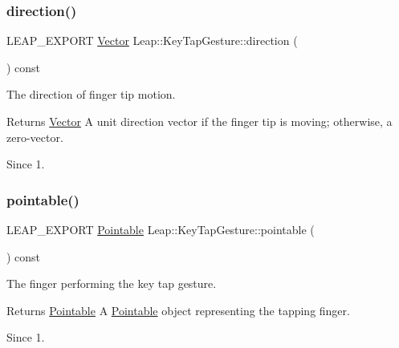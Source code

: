 \subsubsection{\texorpdfstring{direction()}{direction()}}
{\footnotesize\ttfamily L\+E\+A\+P\+\_\+\+E\+X\+P\+O\+RT \hyperlink{struct_leap_1_1_vector}{Vector} Leap\+::\+Key\+Tap\+Gesture\+::direction (\begin{DoxyParamCaption}{ }\end{DoxyParamCaption}) const}

The direction of finger tip motion.


\begin{DoxyCodeInclude}
\end{DoxyCodeInclude}


\begin{DoxyReturn}{Returns}
\hyperlink{struct_leap_1_1_vector}{Vector} A unit direction vector if the finger tip is moving; otherwise, a zero-\/vector. 
\end{DoxyReturn}
\begin{DoxySince}{Since}
1. 
\end{DoxySince}
\mbox{\label{class_leap_1_1_key_tap_gesture_a74aae63f639ac529969bc2b3a9a8bbc7}} 
\subsubsection{\texorpdfstring{pointable()}{pointable()}}
{\footnotesize\ttfamily L\+E\+A\+P\+\_\+\+E\+X\+P\+O\+RT \hyperlink{class_leap_1_1_pointable}{Pointable} Leap\+::\+Key\+Tap\+Gesture\+::pointable (\begin{DoxyParamCaption}{ }\end{DoxyParamCaption}) const}

The finger performing the key tap gesture.


\begin{DoxyCodeInclude}
\end{DoxyCodeInclude}


\begin{DoxyReturn}{Returns}
\hyperlink{class_leap_1_1_pointable}{Pointable} A \hyperlink{class_leap_1_1_pointable}{Pointable} object representing the tapping finger. 
\end{DoxyReturn}
\begin{DoxySince}{Since}
1. 
\end{DoxySince}
\mbox{\label{class_leap_1_1_key_tap_gesture_ac69928f2af458cc3d275bf3c0deea11c}} 
